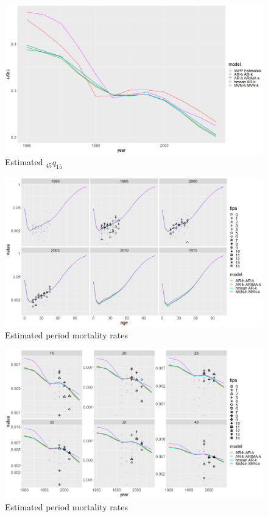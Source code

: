 \documentclass[12pt,a4paper]{article}
\begin{document}
\newpage
\begin{figure}[H]
\includegraphics[width = \linewidth]{Burkina Faso/6/q4515.png}
\caption{Estimated $_{45}q_{15}$}
\end{figure}
\newpage
\begin{figure}[H]
\includegraphics[width = \linewidth]{Burkina Faso/6/period mx.png}
\caption{Estimated period mortality rates}
\end{figure}
\begin{figure}[H]
\includegraphics[width = \linewidth]{Burkina Faso/6/age mx.png}
\caption{Estimated period mortality rates}
\end{figure}
\end{document}
